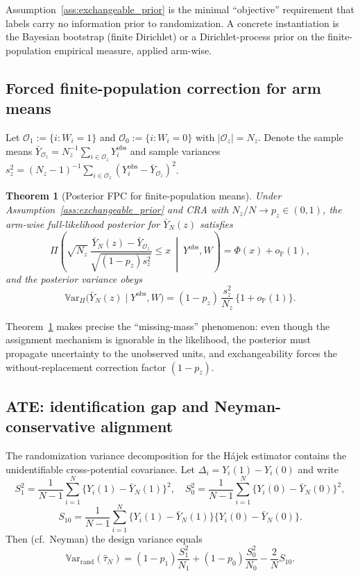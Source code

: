 \documentclass[aos]{imsart}
\newtheorem{theorem}{Theorem}
\theoremstyle{definition}
\theoremstyle{plain}
\newcommand{\Var}{\mathbb{V}\mathrm{ar}}
\newcommand{\PhiN}{\Phi}
\begin{document}
Assumption~\ref{ass:exchangeable_prior} is the minimal ``objective'' requirement that
labels carry no information prior to randomization.
A concrete instantiation is the Bayesian bootstrap (finite Dirichlet) or a
Dirichlet-process prior on the finite-population empirical measure, applied arm-wise.

\subsection{Forced finite-population correction for arm means}

Let $\mathcal O_1:=\{i:W_i=1\}$ and $\mathcal O_0:=\{i:W_i=0\}$ with $|\mathcal O_z|=N_z$.
Denote the sample means $\bar Y_{\mathcal O_z}=N_z^{-1}\sum_{i\in\mathcal O_z}Y_i^{\mathrm{obs}}$
and sample variances
$s_z^2=(N_z-1)^{-1}\sum_{i\in\mathcal O_z}(Y_i^{\mathrm{obs}}-\bar Y_{\mathcal O_z})^2$.

\begin{theorem}[Posterior FPC for finite-population means]\label{thm:posterior_fpc}
Under Assumption~\ref{ass:exchangeable_prior} and CRA with $N_z/N\to p_z\in(0,1)$,
the arm-wise full-likelihood posterior for $\bar Y_N(z)$ satisfies
\[
\Pi\!\left(
\sqrt{N_z}\,\frac{\bar Y_N(z)-\bar Y_{\mathcal O_z}}{\sqrt{(1-p_z)s_z^2}}
\le x \ \middle|\  Y^{\mathrm{obs}},W
\right)
=
\PhiN(x)+o_{\mathbb P}(1),
\]
and the posterior variance obeys
\[
\Var_{\Pi}\!\bigl(\bar Y_N(z)\mid Y^{\mathrm{obs}},W\bigr)
=
(1-p_z)\,\frac{s_z^2}{N_z}\,\{1+o_{\mathbb P}(1)\}.
\]
\end{theorem}

Theorem~\ref{thm:posterior_fpc} makes precise the ``missing-mass'' phenomenon:
even though the assignment mechanism is ignorable in the likelihood, the posterior must
propagate uncertainty to the unobserved units, and exchangeability forces the
without-replacement correction factor $(1-p_z)$.

\subsection{ATE: identification gap and Neyman-conservative alignment}

The randomization variance decomposition for the Hájek estimator
contains the unidentifiable cross-potential covariance.
Let $\Delta_i=Y_i(1)-Y_i(0)$ and write
\[
S_1^2=\frac{1}{N-1}\sum_{i=1}^N \{Y_i(1)-\bar Y_N(1)\}^2,\quad
S_0^2=\frac{1}{N-1}\sum_{i=1}^N \{Y_i(0)-\bar Y_N(0)\}^2,
\]
\[
S_{10}=\frac{1}{N-1}\sum_{i=1}^N \{Y_i(1)-\bar Y_N(1)\}\{Y_i(0)-\bar Y_N(0)\}.
\]
Then (cf.\ Neyman) the design variance equals
\[
\Var_{\mathrm{rand}}(\hat\tau_N)
=
(1-p_1)\frac{S_1^2}{N_1}
+
(1-p_0)\frac{S_0^2}{N_0}
-\frac{2}{N}S_{10}.
\]
\end{document}
